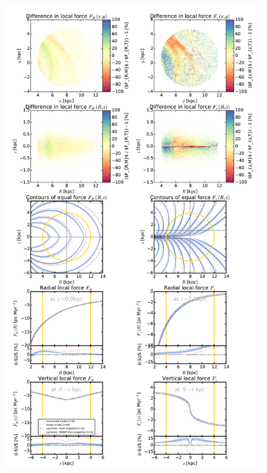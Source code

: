 \documentclass[iop,revtex4,numberedappendix,appendixfloats]{emulateapj}
\begin{document}
\begin{figure}[!htbp]
\centering
\includegraphics[height=0.9\textheight]{fig/MNdHHdiffSph2_4kpc8Spiral_a_test1_forces_overview_4.pdf}

\end{figure}
\end{document}
